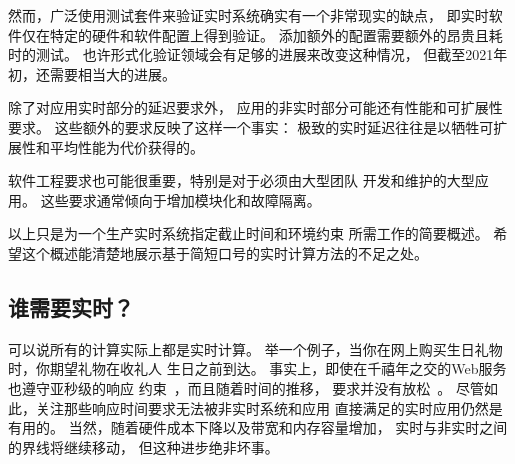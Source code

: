 然而，广泛使用测试套件来验证实时系统确实有一个非常现实的缺点，
即实时软件仅在特定的硬件和软件配置上得到验证。
添加额外的配置需要额外的昂贵且耗时的测试。
也许形式化验证领域会有足够的进展来改变这种情况，
但截至2021年初，还需要相当大的进展。

\QuickQuizEnd

除了对应用实时部分的延迟要求外，
应用的非实时部分可能还有性能和可扩展性要求。
这些额外的要求反映了这样一个事实：
极致的实时延迟往往是以牺牲可扩展性和平均性能为代价获得的。

软件工程要求也可能很重要，特别是对于必须由大型团队
开发和维护的大型应用。
这些要求通常倾向于增加模块化和故障隔离。

以上只是为一个生产实时系统指定截止时间和环境约束
所需工作的简要概述。
希望这个概述能清楚地展示基于简短口号的实时计算方法的不足之处。

\subsection{谁需要实时？}
\label{sec:advsync:Who Needs Real-Time?}

可以说所有的计算实际上都是实时计算。
举一个例子，当你在网上购买生日礼物时，你期望礼物在收礼人
生日之前到达。
事实上，即使在千禧年之交的Web服务也遵守亚秒级的响应
约束~\cite{KristofferBohmann2001a}，而且随着时间的推移，
要求并没有放松~\cite{DeCandia:2007:DAH:1323293.1294281}。
尽管如此，关注那些响应时间要求无法被非实时系统和应用
直接满足的实时应用仍然是有用的。
当然，随着硬件成本下降以及带宽和内存容量增加，
实时与非实时之间的界线将继续移动，
但这种进步绝非坏事。

